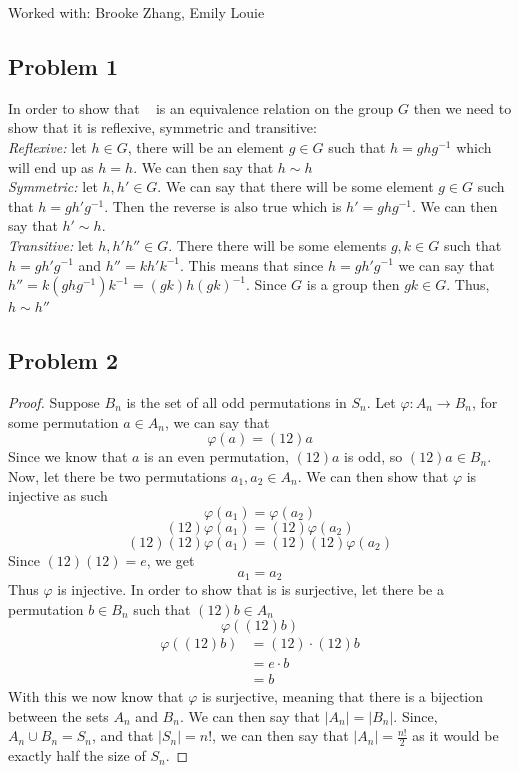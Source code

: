 \documentclass[12pt]{article}
\begin{document}
Worked with: Brooke Zhang, Emily Louie
\subsection*{Problem 1}
In order to show that ~ is an equivalence relation on the group $G$ then we need to show that it is reflexive, symmetric and transitive:\\
\textit{Reflexive: } let $h \in G$, there will be an element $g \in G$ such that $h = ghg^{-1}$ which will end up as $h = h$. We can then say that $h \sim h$\\
\textit{Symmetric: } let $h,h' \in G$. We can say that there will be some element $g \in G$ such that $h  = gh'g^{-1}$. Then the reverse is also true which is $h' = ghg^{-1}$. We can then say that $h' \sim h$.\\
\textit{Transitive: } let $h,h'h'' \in G$. There there will be some elements $g,k \in G$ such that $h = gh'g^{-1}$ and $h'' = kh'k^{-1}$. This means that since $h = gh'g^{-1}$ we can say that $h'' = k(ghg^{-1})k^{-1} = (gk)h(gk)^{-1}$. Since $G$ is a group then $gk \in G$. Thus, $h \sim h''$
\subsection*{Problem 2}
\begin{proof}
Suppose $B_n$ is the set of all odd permutations in $S_n$. Let $\varphi: A_n \rightarrow B_n$, for some permutation $a \in A_n$, we can say that
\[
	\varphi(a) = (1 2)a
\]
Since we know that $a$ is an even permutation, $(1 2)a$ is odd, so $(1 2)a \in B_n$.\\
Now, let there be two permutations $a_1,a_2 \in A_n$. We can then show that $\varphi$ is injective as such
\[ \varphi(a_1) = \varphi(a_2) \]
\[ (12)\varphi(a_1) = (1 2)\varphi(a_2) \]
\[ (12)(12)\varphi(a_1) = (12)(12)\varphi(a_2) \]
Since $(1 2)(1 2) = e$, we get
\[ a_1 = a_2 \]
Thus $\varphi$ is injective. In order to show that is is surjective, let there be a permutation $b \in B_n$ such that $(1 2)b \in A_n$
\[ \varphi((1 2)b) \]
\begin{align*}
\varphi((12)b) &= (12)\cdot (12)b\\
 &= e \cdot b\\
 &= b
\end{align*}
With this we now know that $\varphi$ is surjective, meaning that there is a bijection between the sets $A_n$ and $B_n$. We can then say that $|A_n| = |B_n|$. Since, $A_n \cup B_n = S_n$, and that $|S_n| = n!$, we can then say that $|A_n| = \frac{n!}{2}$ as it would be exactly half the size of $S_n$.
\end{proof}
\newpage
\end{document}
